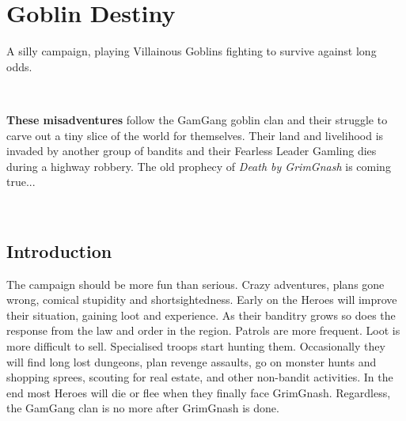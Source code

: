 \cleardoublepage
\pagestyle{fancy}
\flushbottom

\setcounter{page}{1}








\section*{Goblin Destiny}

A silly campaign, playing Villainous Goblins fighting to survive against long odds.

\

\noindent \textbf{These misadventures} follow the GamGang goblin clan and their struggle to carve out a tiny slice of the world for themselves. Their land and livelihood is invaded by another group of bandits and their Fearless Leader Gamling dies during a highway robbery. The old prophecy of \emph{Death by GrimGnash} is coming true...

\

\tableofcontents                                   %

\vspace{4\baselineskip}


\subsection*{Introduction}

The campaign should be more fun than serious. Crazy adventures, plans gone wrong, comical stupidity and shortsightedness. Early on the Heroes will improve their situation, gaining loot and experience. As their banditry grows so does the response from the law and order in the region. Patrols are more frequent. Loot is more difficult to sell. Specialised troops start hunting them. Occasionally they will find long lost dungeons, plan revenge assaults, go on monster hunts and shopping sprees, scouting for real estate, and other non-bandit activities. In the end most Heroes will die or flee when they finally face GrimGnash. Regardless, the GamGang clan is no more after GrimGnash is done.

